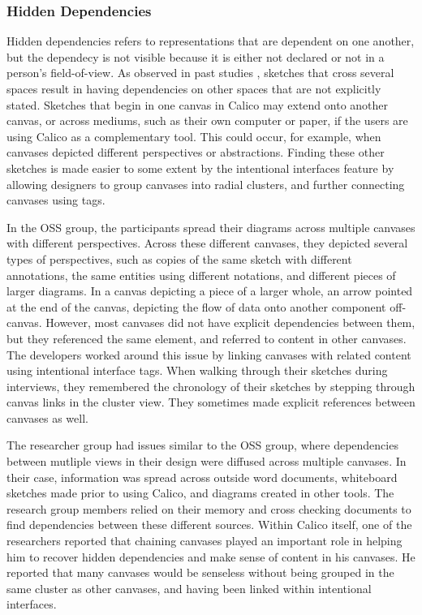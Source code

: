 \subsubsection{Hidden Dependencies}
Hidden dependencies refers to representations that are dependent on one another, but the dependecy is not visible because it is either not declared or not in a person's field-of-view. As observed in past studies \cite{dekel2007notation}, sketches that cross several spaces result in having dependencies on other spaces that are not explicitly stated. Sketches that begin in one canvas in Calico may extend onto another canvas, or across mediums, such as their own computer or paper, if the users are using Calico as a complementary tool. This could occur, for example, when canvases depicted different perspectives or abstractions. Finding these other sketches is made easier to some extent by the intentional interfaces feature by allowing designers to group canvases into radial clusters, and further connecting canvases using tags. 

In the OSS group, the participants spread their diagrams across multiple canvases with different perspectives. Across these different canvases, they depicted several types of perspectives, such as copies of the same sketch with different annotations, the same entities using different notations, and different pieces of larger diagrams. In a canvas depicting a piece of a larger whole, an arrow pointed at the end of the canvas, depicting the flow of data onto another component off-canvas. However, most canvases did not have explicit dependencies between them, but they referenced the same element, and referred to content in other canvases. The developers worked around this issue by linking canvases with related content using intentional interface tags. When walking through their sketches during interviews, they remembered the chronology of their sketches by stepping through canvas links in the cluster view. They sometimes made explicit references between canvases as well.   

The researcher group had issues similar to the OSS group, where dependencies between mutliple views in their design were diffused across multiple canvases. In their case, information was spread across outside word documents, whiteboard sketches made prior to using Calico, and diagrams created in other tools. The research group members relied on their memory and cross checking documents to find dependencies between these different sources. Within Calico itself, one of the researchers reported that chaining canvases played an important role in helping him to recover hidden dependencies and make sense of content in his canvases. He reported that many canvases would be senseless without being grouped in the same cluster as other canvases, and having been linked within intentional interfaces.

